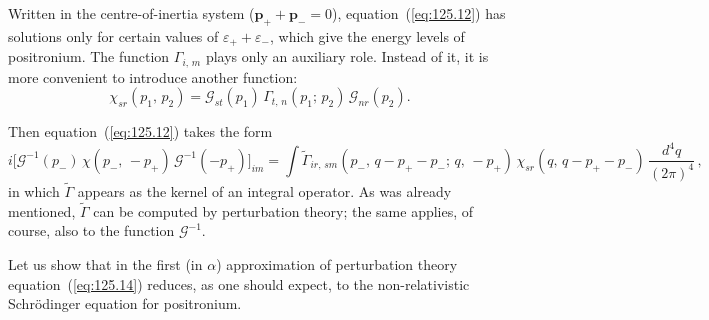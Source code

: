 Written in the centre-of-inertia system ($\mathbf{p}_+ + \mathbf{p}_- = 0$), equation~(\ref{eq:125.12}) has solutions only for certain values of $\varepsilon_+ + \varepsilon_-$, which give the energy levels of positronium. The function $\Gamma_{i,\,m}$ plays only an auxiliary role. Instead of it, it is more convenient to introduce another function:
\begin{equation}
\chi_{sr}(p_1,\,p_2) = \mathcal{G}_{st}(p_1)\,\Gamma_{t,\,n}(p_1;\,p_2)\,\mathcal{G}_{nr}(p_2).
\label{eq:125.13}
\end{equation}


\noindent Then equation~(\ref{eq:125.12}) takes the form
\begin{equation}
i\bigl[\mathcal{G}^{-1}(p_-)\,\chi(p_-,\,-p_+)\,\mathcal{G}^{-1}(-p_+)\bigr]_{im} = \int \widetilde{\Gamma}_{ir,\,sm}(p_-,\,q - p_+ - p_-;\,q,\,-p_+)\,\chi_{sr}(q,\,q - p_+ - p_-)\,\frac{d^4 q}{(2\pi)^4}\,,
\label{eq:125.14}
\end{equation}
in which $\widetilde{\Gamma}$ appears as the kernel of an integral operator. As was already mentioned, $\widetilde{\Gamma}$ can be computed by perturbation theory; the same applies, of course, also to the function $\mathcal{G}^{-1}$.

Let us show that in the first (in $\alpha$) approximation of perturbation theory equation~(\ref{eq:125.14}) reduces, as one should expect, to the non-relativistic Schr\"odinger equation for positronium.

